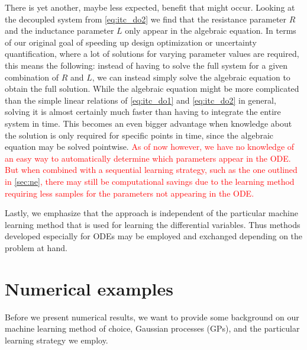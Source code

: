 \documentclass[AMA,STIX1COL]{WileyNJD-v2}
\begin{document}
There is yet another, maybe less expected, benefit that might occur. Looking at the decoupled system from \eqref{eq:itc_do2} we find that the resistance parameter $R$ and the inductance parameter $L$ only appear in the algebraic equation. In terms of our original goal of speeding up design optimization or uncertainty quantification, where a lot of solutions for varying parameter values are required, this means the following: instead of having to solve the full system for a given combination of $R$ and $L$, we can instead simply solve the algebraic equation to obtain the full solution. While the algebraic equation might be more complicated than the simple linear relations of \eqref{eq:itc_do1} and \eqref{eq:itc_do2} in general, solving it is almost certainly much faster than having to integrate the entire system in time. This becomes an even bigger advantage when knowledge about the solution is only required for specific points in time, since the algebraic equation may be solved pointwise. \textcolor{red}{As of now however, we have no knowledge of an easy way to automatically determine which parameters appear in the ODE. But when combined with a sequential learning strategy, such as the one outlined in \autoref{sec:ne}, there may still be computational savings due to the learning method requiring less samples for the parameters not appearing in the ODE.}

Lastly, we emphasize that the approach is independent of the particular machine learning method that is used for learning the differential variables. Thus methods developed especially for ODEs may be employed and exchanged depending on the problem at hand.

\section{Numerical examples}
\label{sec:ne}
Before we present numerical results, we want to provide some background on our machine learning method of choice, Gaussian processes (GPs), and the particular learning strategy we employ.
\end{document}
